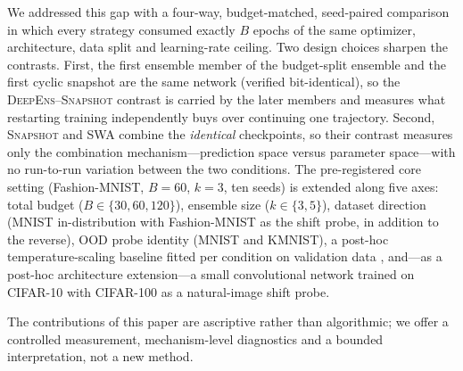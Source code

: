 \documentclass[11pt,a4paper]{article}
\newcommand{\deepens}{\textsc{DeepEns}}
\newcommand{\snapshot}{\textsc{Snapshot}}
\newcommand{\swa}{\textsc{SWA}}
\begin{document}
We addressed this gap with a four-way, budget-matched, seed-paired
comparison in which every strategy consumed exactly $B$ epochs of the same
optimizer, architecture, data split and learning-rate ceiling. Two design
choices sharpen the contrasts. First, the first ensemble
member of the budget-split ensemble and the first cyclic snapshot are the
same network (verified bit-identical), so the \deepens{}--\snapshot{}
contrast is carried by the later members and measures what restarting
training independently buys over continuing one trajectory. Second, \snapshot{} and \swa{} combine the
\emph{identical} checkpoints, so their contrast measures only the combination
mechanism---prediction space versus parameter space---with no run-to-run
variation between the two conditions. The pre-registered core setting (Fashion-MNIST, $B=60$, $k=3$, ten
seeds) is extended along five axes: total budget ($B \in
\{30,60,120\}$), ensemble size ($k \in \{3,5\}$), dataset direction
(MNIST in-distribution with Fashion-MNIST as the shift probe, in addition
to the reverse), OOD probe identity (MNIST and KMNIST), a post-hoc
temperature-scaling baseline fitted per condition on validation data
\citep{guo2017,zhang2020}, and---as a post-hoc architecture extension---a
small convolutional network trained on CIFAR-10 with CIFAR-100 as a
natural-image shift probe.

The contributions of this paper are ascriptive rather than algorithmic; we
offer a controlled measurement, mechanism-level diagnostics and a bounded
interpretation, not a new method.
\end{document}
